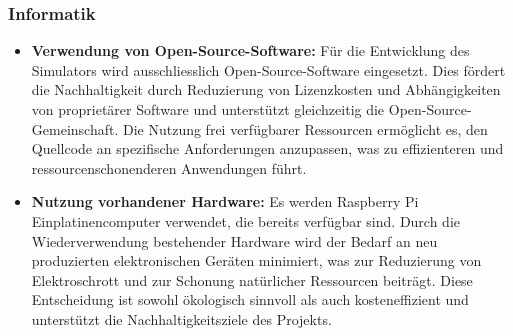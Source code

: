 \documentclass[../../main.tex]{subfiles} %
\begin{document}
\subsubsection{Informatik}

\begin{itemize}
  \item \textbf{Verwendung von Open-Source-Software:} Für die
        Entwicklung des Simulators wird ausschliesslich
        Open-Source-Software eingesetzt. Dies fördert die Nachhaltigkeit
        durch Reduzierung von Lizenzkosten und Abhängigkeiten von
        proprietärer Software und unterstützt gleichzeitig die
        Open-Source-Gemeinschaft. Die Nutzung frei verfügbarer Ressourcen
        ermöglicht es, den Quellcode an spezifische Anforderungen
        anzupassen, was zu effizienteren und ressourcenschonenderen
        Anwendungen führt.

  \item \textbf{Nutzung vorhandener Hardware:} Es werden Raspberry Pi
        Einplatinencomputer verwendet, die bereits verfügbar sind. Durch
        die Wiederverwendung bestehender Hardware wird der Bedarf an neu
        produzierten elektronischen Geräten minimiert, was zur
        Reduzierung von Elektroschrott und zur Schonung natürlicher
        Ressourcen beiträgt. Diese Entscheidung ist sowohl ökologisch
        sinnvoll als auch kosteneffizient und unterstützt die
        Nachhaltigkeitsziele des Projekts.
\end{itemize}
\end{document}
